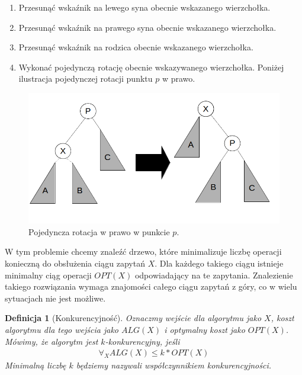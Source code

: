 \documentclass[declaration,shortabstract]{iithesis}
\newcounter{thm}[section]
\theoremstyle{thm}
\newtheorem{definition}[thm]{Definicja}
\theoremstyle{remark}
\theoremstyle{plain}
\theoremstyle{plain}
\theoremstyle{plain}
\begin{document}
\begin{enumerate}   

\item {Przesunąć wskaźnik na lewego syna obecnie wskazanego wierzchołka.}   

\item {Przesunąć wskaźnik na prawego syna obecnie wskazanego wierzchołka.}   

\item {Przesunąć wskaźnik na rodzica obecnie wskazanego wierzchołka.}   

\item {Wykonać pojedynczą rotację obecnie wskazywanego wierzchołka. Poniżej ilustracja pojedynczej rotacji punktu $p$ w prawo.}    

\end{enumerate}   
\begin{figure}[H]
\centering    
\includegraphics[scale = 0.45]{zig.png}  
\caption{Pojedyncza rotacja w prawo w punkcie $p$.} 
\label{fig:1} 
\end{figure}  

 
W tym problemie chcemy znaleźć drzewo, które minimalizuje liczbę operacji konieczną do obsłużenia ciągu zapytań \(X\). 
Dla każdego takiego ciągu istnieje minimalny ciąg operacji \(OPT(X)\) odpowiadający na te zapytania. Znalezienie takiego rozwiązania wymaga znajomości całego ciągu zapytań z góry, co w wielu sytuacjach nie jest możliwe.

\begin{definition}[Konkurencyjność]
Oznaczmy wejście dla algorytmu jako \(X\), koszt algorytmu dla tego wejścia jako \(ALG(X)\) i optymalny koszt jako \(OPT(X)\).
Mówimy, że algorytm jest $k$-konkurencyjny, jeśli
\begin{align*}
\forall_{X} ALG(X) \leq k*OPT(X)
\end{align*}
Minimalną liczbę $k$ będziemy nazywali współczynnikiem konkurencyjności.
\end{definition}  
\end{document}
